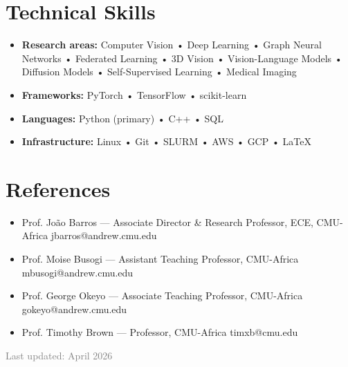 \documentclass[11pt,letterpaper]{article}
\begin{document}
\section{Technical Skills}
\begin{itemize}
    \item[] \textbf{Research areas:} Computer Vision • Deep Learning • Graph Neural Networks • Federated Learning • 3D Vision • Vision-Language Models • Diffusion Models • Self-Supervised Learning • Medical Imaging
    \item[] \textbf{Frameworks:} PyTorch • TensorFlow • scikit-learn
    \item[] \textbf{Languages:} Python (primary) • C++ • SQL
    \item[] \textbf{Infrastructure:} Linux • Git • SLURM • AWS • GCP • LaTeX
\end{itemize}

\section{References}
\begin{itemize}
    \item[] Prof. João Barros — Associate Director \& Research Professor, ECE, CMU-Africa \hfill jbarros@andrew.cmu.edu
    \item[] Prof. Moise Busogi — Assistant Teaching Professor, CMU-Africa \hfill mbusogi@andrew.cmu.edu
    \item[] Prof. George Okeyo — Associate Teaching Professor, CMU-Africa \hfill gokeyo@andrew.cmu.edu
    \item[] Prof. Timothy Brown — Professor, CMU-Africa \hfill timxb@cmu.edu
\end{itemize}

\vfill
\small\textcolor{gray}{Last updated: April 2026}
\end{document}

